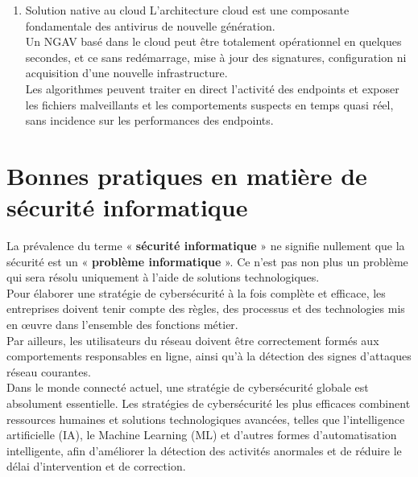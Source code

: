\begin{enumerate}
 \item Solution native au cloud
 L’architecture cloud est une composante fondamentale des antivirus de nouvelle génération.\\
  Un NGAV basé dans le cloud peut être totalement opérationnel en quelques secondes, et ce sans redémarrage, mise à jour des signatures, configuration ni acquisition d’une nouvelle infrastructure.\\
   Les algorithmes peuvent traiter en direct l’activité des endpoints et exposer les fichiers malveillants et les comportements suspects en temps quasi réel, sans incidence sur les performances des endpoints.\\
\end{enumerate}

\section{Bonnes pratiques en matière de sécurité informatique}

La prévalence du terme « \textbf{sécurité informatique} » ne signifie nullement que la sécurité est un « \textbf{problème informatique }». Ce n’est pas non plus un problème qui sera résolu uniquement à l’aide de solutions technologiques.\\ Pour élaborer une stratégie de cybersécurité à la fois complète et efficace, les entreprises doivent tenir compte des règles, des processus et des technologies mis en œuvre dans l’ensemble des fonctions métier.\\ Par ailleurs, les utilisateurs du réseau doivent être correctement formés aux comportements responsables en ligne, ainsi qu’à la détection des signes d’attaques réseau courantes.\\
Dans le monde connecté actuel, une stratégie de cybersécurité globale est absolument essentielle. Les stratégies de cybersécurité les plus efficaces combinent ressources humaines et solutions technologiques avancées, telles que l’intelligence artificielle (IA), le Machine Learning (ML) et d’autres formes d’automatisation intelligente, afin d’améliorer la détection des activités anormales et de réduire le délai d’intervention et de correction.\\



